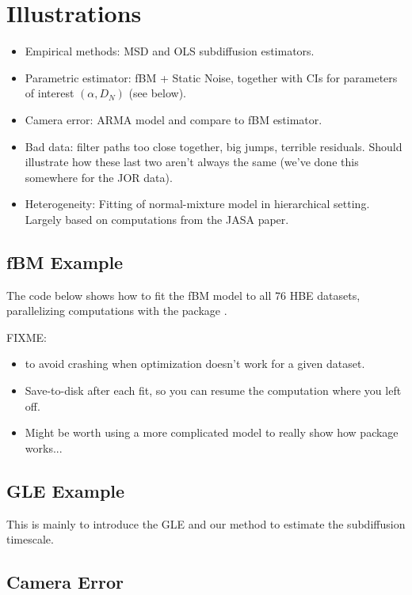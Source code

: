 \documentclass[article]{jss}
\begin{document}
\section{Illustrations}

\begin{itemize}
\item Empirical methods: MSD and OLS subdiffusion estimators.
\item Parametric estimator: fBM + Static Noise, together with CIs for parameters of interest $(\alpha, D_N)$ (see below).
\item Camera error: ARMA model and compare to fBM estimator.
\item Bad data: filter paths too close together, big jumps, terrible residuals.  Should illustrate how these last two aren't always the same (we've done this somewhere for the JOR data).
\item Heterogeneity: Fitting of normal-mixture model in hierarchical setting.  Largely based on computations from the JASA paper.
\end{itemize}

\subsection{fBM Example}

The  code below shows how to fit the fBM model to all 76 HBE datasets, parallelizing computations with the  package .

FIXME:
\begin{itemize}
\item {} to avoid crashing when optimization doesn't work for a given dataset.
\item Save-to-disk after each fit, so you can resume the computation where you left off.
\item Might be worth using a more complicated model to really show how package works...
\end{itemize}

\subsection{GLE Example}

This is mainly to introduce the GLE and our method to estimate the subdiffusion timescale.

\subsection{Camera Error}
\end{document}
